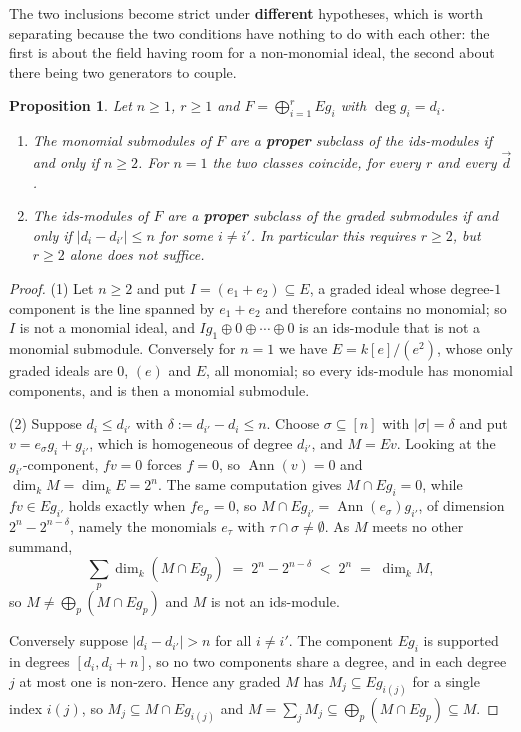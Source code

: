 \documentclass[11pt, a4paper, abstract=yes]{scrartcl}
\theoremstyle{definition}
\theoremstyle{remark}
\theoremstyle{plain}
\newtheorem{proposition}[definition]{Proposition}
\begin{document}
The two inclusions become strict under \textbf{different} hypotheses, which is worth separating because the
two conditions have nothing to do with each other: the first is about the field having room for a
non-monomial ideal, the second about there being two generators to couple.

\begin{proposition}
Let \(n\ge1\), \(r\ge1\) and \(F=\bigoplus_{i=1}^rEg_i\) with \(\deg g_i=d_i\).
\begin{enumerate}
\item The monomial submodules of \(F\) are a \textbf{proper} subclass of the ids-modules if and only if
\(n\ge2\). For \(n=1\) the two classes coincide, for every \(r\) and every \(\vec d\).
\item The ids-modules of \(F\) are a \textbf{proper} subclass of the graded submodules if and only if
\(\lvert d_i-d_{i'}\rvert\le n\) for some \(i\ne i'\). In particular this requires \(r\ge2\), but
\(r\ge2\) alone does not suffice.
\end{enumerate}
\label{prop-hierarchy-strict}
\end{proposition}

\begin{proof}
(1) Let \(n\ge2\) and put \(I=(e_1+e_2)\subseteq E\), a graded ideal whose degree-\(1\) component is
the line spanned by \(e_1+e_2\) and therefore contains no monomial; so \(I\) is not a monomial ideal,
and \(Ig_1\oplus0\oplus\cdots\oplus0\) is an ids-module that is not a monomial submodule. Conversely
for \(n=1\) we have \(E=k[e]/(e^2)\), whose only graded ideals are \(0\), \((e)\) and \(E\), all
monomial;
so every ids-module has monomial components, and is then a monomial submodule.

(2) Suppose \(d_i\le d_{i'}\) with \(\delta:=d_{i'}-d_i\le n\). Choose \(\sigma\subseteq[n]\) with
\(\lvert\sigma\rvert=\delta\) and put \(v=e_\sigma g_i+g_{i'}\), which is homogeneous of degree
\(d_{i'}\), and \(M=Ev\). Looking at the \(g_{i'}\)-component, \(fv=0\) forces \(f=0\), so
\(\operatorname{Ann}(v)=0\) and \(\dim_kM=\dim_kE=2^n\). The same computation gives
\(M\cap Eg_i=0\), while \(fv\in Eg_{i'}\) holds exactly when \(fe_\sigma=0\), so
\(M\cap Eg_{i'}=\operatorname{Ann}(e_\sigma)g_{i'}\), of dimension \(2^n-2^{n-\delta}\), namely the
monomials \(e_\tau\) with \(\tau\cap\sigma\ne\emptyset\). As \(M\) meets no other summand,
\begin{equation}\label{eq:hierarchy-strict}
  \sum_{p}\dim_k(M\cap Eg_p)\;=\;2^n-2^{n-\delta}\;<\;2^n\;=\;\dim_kM ,
\end{equation}
so \(M\ne\bigoplus_p(M\cap Eg_p)\) and \(M\) is not an ids-module.

Conversely suppose \(\lvert d_i-d_{i'}\rvert>n\) for all \(i\ne i'\). The component \(Eg_i\) is
supported in degrees \([d_i,d_i+n]\), so no two components share a degree, and in each degree \(j\)
at most one is non-zero. Hence any graded \(M\) has \(M_j\subseteq Eg_{i(j)}\) for a single index
\(i(j)\), so \(M_j\subseteq M\cap Eg_{i(j)}\) and \(M=\sum_jM_j\subseteq\bigoplus_p(M\cap Eg_p)\subseteq M\).
\end{proof}
\end{document}
